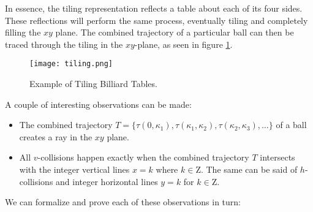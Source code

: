 In essence, the tiling representation reflects a table about each of its four sides. These reflections will perform the same process, eventually tiling and completely filling the $xy$ plane. The combined trajectory of a particular ball can then be traced through the tiling in the $xy$-plane, as seen in figure \ref{fig:tiling}.

\begin{figure}[H]
  \begin{center}
    \texttt{[image: tiling.png]}
  \end{center}
  \vspace{-.2in} %
  \caption{\label{fig:tiling}Example of Tiling Billiard Tables.}
\end{figure}

A couple of interesting observations can be made:

\begin{itemize}
  \item The combined trajectory $T = \{\tau(0, \kappa_1), \tau(\kappa_1, \kappa_2), \tau(\kappa_2, \kappa_3), \ldots \}$ of a ball creates a ray in the $xy$ plane.
  \item All $v$-collisions happen exactly when the combined trajectory $T$ intersects with the integer vertical lines $x = k$ where $k \in \mathrm{Z}$. The same can be said of $h$-collisions and integer horizontal lines $y = k$ for $k \in \mathrm{Z}$.
\end{itemize}

We can formalize and prove each of these observations in turn:

